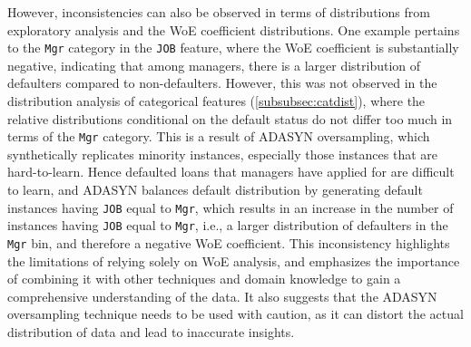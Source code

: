  However, inconsistencies can also be observed in terms of distributions from exploratory analysis and the WoE coefficient distributions.
 One example pertains to the \texttt{Mgr} category in the \texttt{JOB} feature, where the WoE coefficient is substantially negative, indicating that among managers, there is a larger distribution of defaulters compared to non-defaulters.
 However, this was not observed in the distribution analysis of categorical features (\autoref{subsubsec:catdist}), where the relative distributions conditional on the default status do not differ too much in terms of the \texttt{Mgr} category.
 This is a result of ADASYN oversampling, which synthetically replicates minority instances, especially those instances that are hard-to-learn.
 Hence defaulted loans that managers have applied for are difficult to learn, and ADASYN balances default distribution by generating default instances having \texttt{JOB} equal to \texttt{Mgr}, which results in an increase in the number of instances having \texttt{JOB} equal to \texttt{Mgr}, i.e., a larger distribution of defaulters in the \texttt{Mgr} bin, and therefore a negative WoE coefficient.
 This inconsistency highlights the limitations of relying solely on WoE analysis, and emphasizes the importance of combining it with other techniques and domain knowledge to gain a comprehensive understanding of the data.
 It also suggests that the ADASYN oversampling technique needs to be used with caution, as it can distort the actual distribution of data and lead to inaccurate insights.

